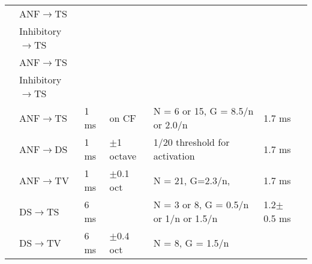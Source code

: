 \begin{longtable}{cXXXXXX}
            \citealp*{WangSachs:1995}             &  ANF\ensuremath{\rightarrow}TS  &               &                                                                           &                                                   & \\
           &  Inhibitory\ensuremath{\rightarrow}TS  &               &                                                                           &                                                   & \\
         \citealp*{LaiWinslowEtAl:1994}           &  ANF\ensuremath{\rightarrow}TS  &               &                                                                           &                                                   & \\ \midrule
           &  Inhibitory\ensuremath{\rightarrow}TS  &               &                                                                           &                                                   & \\
         \citealp*{ErikssonRobert:1999}           &  ANF\ensuremath{\rightarrow}TS  &     1 ms      &                                   on CF                                   & N = 6 or 15,        G =  8.5/n  or 2.0/n                    
                                                  & 1.7 ms \\
                                                  & {ANF\ensuremath{\rightarrow}DS} &    {1 ms }    &                               $\pm$1 octave                               & {1/20 threshold for activation }                                                        & 1.7 ms \\
                                                  &  ANF\ensuremath{\rightarrow}TV  &     1 ms      &                               $\pm$0.1 oct                                & N = 21,   G=2.3/n,                                                          & 1.7 ms\\ 
                                                  &  DS\ensuremath{\rightarrow}TS   &     6 ms      &                                                                           & N = 3 or 8, G = 0.5/n or 1/n or 1.5/n                                                                       & 1.2$\pm$0.5 ms \\ 
                                                  &  DS\ensuremath{\rightarrow}TV   &     6 ms      &                               $\pm$0.4 oct                                & N = 8,     G = 1.5/n                                                          & \\ 

\end{longtable}
